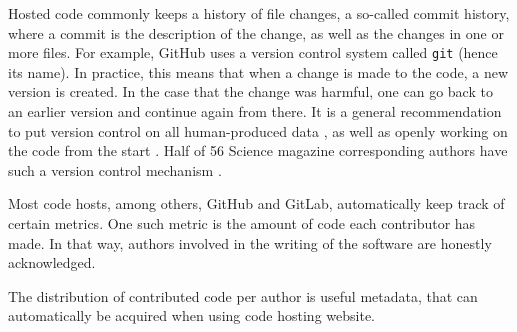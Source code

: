 Hosted code commonly keeps a history of file changes,
a so-called commit history,
where a commit is the description of the change, 
as well as the changes in one or more files.
For example, GitHub
uses a version control system called \verb|git| (hence its name).
In practice, this means that when a change is made to the code,
a new version is created. In the case that the change was harmful,
one can go back to an earlier version and continue again from there.
It is a general recommendation to put version control
on all human-produced data \cite{wilson2014best},
as well as openly working on the code from the start \cite{jimenez2017four}.
Half of 56 Science magazine corresponding authors 
have such a version control mechanism \cite{stodden2018empirical}.


Most code hosts, among others, GitHub and GitLab,
automatically keep track of certain metrics.
One such metric is the amount of code each contributor has made.
In that way, authors involved in the writing of the software
are honestly acknowledged. 

The distribution of contributed code per author 
is useful metadata, that can automatically
be acquired when using code hosting website.

